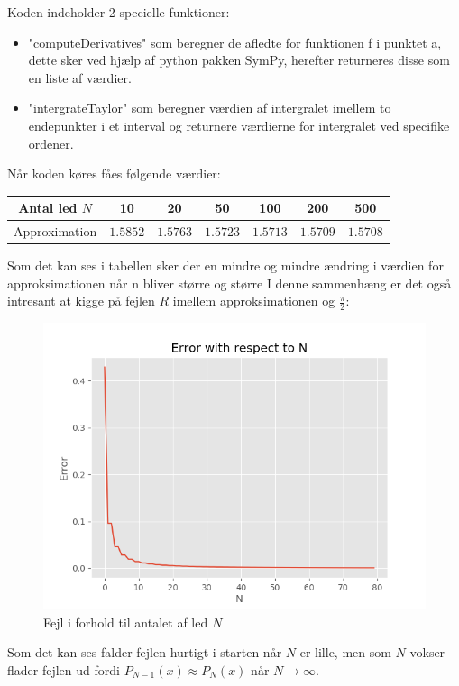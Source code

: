 
Koden indeholder 2 specielle funktioner:
\begin{itemize}
  \item "computeDerivatives" som beregner de afledte for funktionen f 
  i punktet a, dette sker ved hjælp af python pakken SymPy, herefter returneres disse som en liste af værdier.  
  \item "intergrateTaylor" som beregner værdien af intergralet imellem to endepunkter i et interval
  og returnere værdierne for intergralet ved specifike ordener. 
\end{itemize} 
Når koden køres fåes følgende værdier:
\begin{center}
  \begin{tabular}{ |c|c|c|c|c|c|c| }
    \hline
      Antal led $N$ & 10 & 20 & 50 & 100 & 200 & 500 \\
    \hline
      Approximation & $1.5852$ & $1.5763$ & $1.5723$ & $1.5713$ & $1.5709$ & $1.5708$ \\
    \hline
  \end{tabular}
\end{center}
Som det kan ses i tabellen sker der en mindre og mindre ændring i værdien for approksimationen når n bliver større og større
I denne sammenhæng er det også intresant at kigge på fejlen $R$ imellem approksimationen og $\frac{\pi}{2}$:
\begin{figure}[H]
  \centering
  \includegraphics[width=\textwidth]{fig/img/ErrorWithRespectToN.png}
  \caption{Fejl i forhold til antalet af led $N$}
  \label{fig:FejlIForholdTilN}
\end{figure}
Som det kan ses falder fejlen hurtigt i starten når $N$ er lille, men som $N$ vokser flader fejlen ud fordi $P_{N-1}(x) \approx P_{N}(x)$ når $N \rightarrow \infty$.